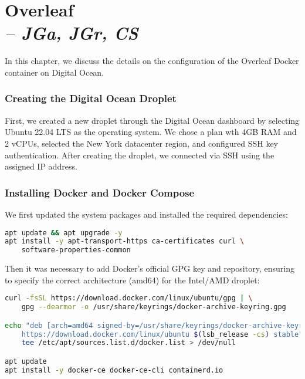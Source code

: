 \chapter[Overleaf]{Overleaf \\
\small{\textit{-- JGa, JGr, CS}}
\label{Chapter::Overleaf}}

In this chapter, we discuss the details on the configuration of the Overleaf Docker container on Digital Ocean.

\subsection{Creating the Digital Ocean Droplet}

First, we created a new droplet through the Digital Ocean dashboard by selecting Ubuntu 22.04 LTS as the operating system. We chose a plan wth 4GB RAM and 2 vCPUs, selected the New York datacenter region, and configured SSH key authentication. After creating the droplet, we connected via SSH using the assigned IP address.

\subsection{Installing Docker and Docker Compose}

We first updated the system packages and installed the required dependencies:

\begin{lstlisting}[language=bash]
apt update && apt upgrade -y
apt install -y apt-transport-https ca-certificates curl \
    software-properties-common
\end{lstlisting}

Then it was necessary to add Docker's official GPG key and repository, ensuring to specify the correct architecture (amd64) for the Intel/AMD droplet:

\begin{lstlisting}[language=bash]
curl -fsSL https://download.docker.com/linux/ubuntu/gpg | \
    gpg --dearmor -o /usr/share/keyrings/docker-archive-keyring.gpg

echo "deb [arch=amd64 signed-by=/usr/share/keyrings/docker-archive-keyring.gpg] \
    https://download.docker.com/linux/ubuntu $(lsb_release -cs) stable" | \
    tee /etc/apt/sources.list.d/docker.list > /dev/null

apt update
apt install -y docker-ce docker-ce-cli containerd.io
\end{lstlisting}

